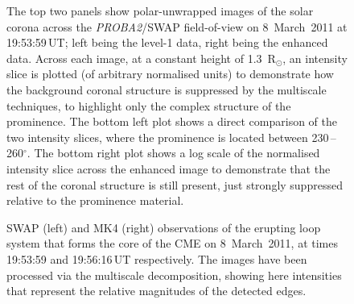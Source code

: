 \documentclass[namedreferences]{solarphysics}
\begin{document}
\begin{article}
\begin{figure}[t]
\caption{The top two panels show polar-unwrapped images of the solar corona across the \emph{PROBA2}/SWAP field-of-view on 8~March~2011 at 19:53:59\,UT; left being the level-1 data, right being the enhanced data. Across each image, at a constant height of 1.3~R$_\odot$, an intensity slice is plotted (of arbitrary normalised units) to demonstrate how the background coronal structure is suppressed by the multiscale techniques, to highlight only the complex structure of the prominence. The bottom left plot shows a direct comparison of the two intensity slices, where the prominence is located between 230\,--\,260$^\circ$. The bottom right plot shows a log scale of the normalised intensity slice across the enhanced image to demonstrate that the rest of the coronal structure is still present, just strongly suppressed relative to the prominence material.}
\label{polar_fig_swap_20110308}
\end{figure}

\begin{figure}[t]
\caption{SWAP (left) and MK4 (right) observations of the erupting loop system that forms the core of the CME on 8~March~2011, at times 19:53:59 and 19:56:16\,UT respectively. The images have been processed via the multiscale decomposition, showing here intensities that represent the relative magnitudes of the detected edges.}
\label{combined_modgrad_points}
\end{figure}



\end{article}
\end{document}
